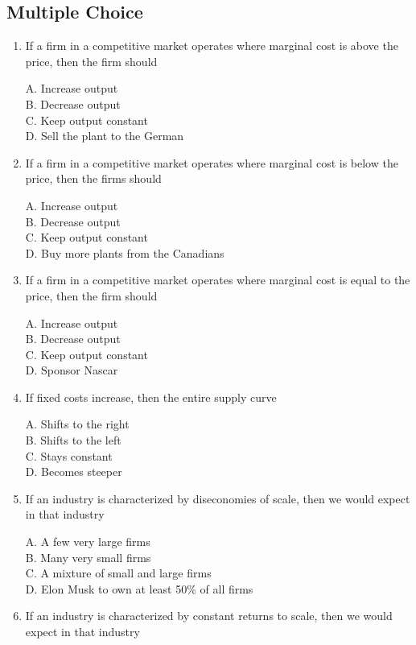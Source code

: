 \documentclass[
]{book}
\begin{document}
\hypertarget{multiple-choice-5}{%
\subsection{Multiple Choice}\label{multiple-choice-5}}

\begin{enumerate}
\def\labelenumi{\arabic{enumi}.}
\item
  If a firm in a competitive market operates where marginal cost is above the price, then the firm should

  A. Increase output\\
  B. Decrease output\\
  C. Keep output constant\\
  D. Sell the plant to the German
\item
  If a firm in a competitive market operates where marginal cost is below the price, then the firms should

  A. Increase output\\
  B. Decrease output\\
  C. Keep output constant\\
  D. Buy more plants from the Canadians
\item
  If a firm in a competitive market operates where marginal cost is equal to the price, then the firm should

  A. Increase output\\
  B. Decrease output\\
  C. Keep output constant\\
  D. Sponsor Nascar
\item
  If fixed costs increase, then the entire supply curve

  A. Shifts to the right\\
  B. Shifts to the left\\
  C. Stays constant\\
  D. Becomes steeper
\item
  If an industry is characterized by diseconomies of scale, then we would expect in that industry

  A. A few very large firms\\
  B. Many very small firms\\
  C. A mixture of small and large firms\\
  D. Elon Musk to own at least 50\% of all firms
\item
  If an industry is characterized by constant returns to scale, then we would expect in that industry


\end{enumerate}
\end{document}
